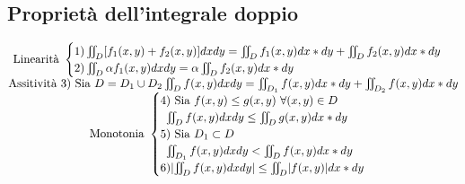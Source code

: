 \subsection{Proprietà dell'integrale doppio}
\begin{equation*}
  \begin{matrix}
  \text{Linearità } \begin{cases}
                      1) \iint_D [f_1(x,y)+f_2(x,y)]dxdy=\iint_Df_1(x,y)dx*dy+\iint_Df_2(x,y)dx*dy\\
                      2) \iint_D \alpha f_1(x,y)dxdy=\alpha\iint_Df_2(x,y)dx*dy
                    \end{cases}\\
    \text{Assitività } 3)\text{ Sia } D=D_1\cup D_2 \iint_Df(x,y)dxdy=\iint_{D_1}f(x,y)dx*dy +\iint_{D_2}f(x,y)dx*dy\\
    \text{Monotonia } \begin{cases}
                        4) \text{ Sia } f(x,y)\leq g(x,y)\text{ } \forall (x,y) \in D\\
                        \text{ }\iint_Df(x,y)dxdy \leq \iint_Dg(x,y)dx*dy\\
                        5) \text{ Sia } D_1 \subset D\\
                        \text{ } \iint_{D_1}f(x,y)dxdy < \iint_Df(x,y)dx*dy \\
                        6) \lvert\iint_Df(x,y)dxdy\rvert \leq \iint_D\lvert f(x,y)\rvert dx*dy
                      \end{cases}
  \end{matrix}
\end{equation*} 

